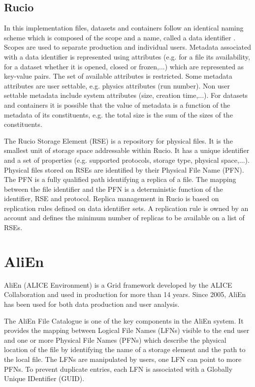 \subsection{Rucio}
In this implementation files, datasets and containers follow an identical naming scheme which is composed of the
scope and a name, called a data identifier \cite{ATLAS-Rucio}. Scopes are used to separate production and individual
users. Metadata associated with a data identifier is represented using attributes (e.g. for a file its availability,
for a dataset whether it is opened, closed or frozen,...) which are represented as key-value pairs. 
The set of available attributes is restricted. Some metadata attributes are user settable, e.g. physics 
attributes (run number). Non user settable metadata include system attributes (size, creation time,...). 
For datasets and containers it is possible that the value of metadata is a function of the metadata of its
constituents, e.g. the total size is the sum of the sizes of the constituents.

The Rucio Storage Element (RSE) is a repository for physical files. It is the smallest unit of
storage space addressable within Rucio. It has a unique identifier and a set of properties (e.g. supported 
protocols, storage type, physical space,...). Physical files stored on RSEs are identified by their Physical File 
Name (PFN).
The PFN is a fully qualified path identifying a replica of a file. The mapping between the file identifier and
the PFN is a deterministic function of the identifier, RSE and protocol. Replica management in Rucio is based on
replication rules defined on data identifier sets. A replication rule is owned by an account and defines the 
minimum number of replicas to be available on a list of RSEs.

\section{AliEn}

AliEn (ALICE Environment) \cite{AliEn2} is a Grid framework developed by the ALICE
Collaboration and used in production for more than 14 years. Since 2005, AliEn
has been used for both data production and user analysis. 

The AliEn File Catalogue is one of the key components in the AliEn system. It
provides the mapping between Logical File Names (LFNs) visible to the end user
and one or more Physical File Names (PFNs) which describe the physical location
of the file by identifying the name of a storage element and the path to the
local file. The LFNs are manipulated by users, one LFN can point to more PFNs.
To prevent duplicate entries, each LFN is associated with a Globally Unique
IDentifier (GUID).

